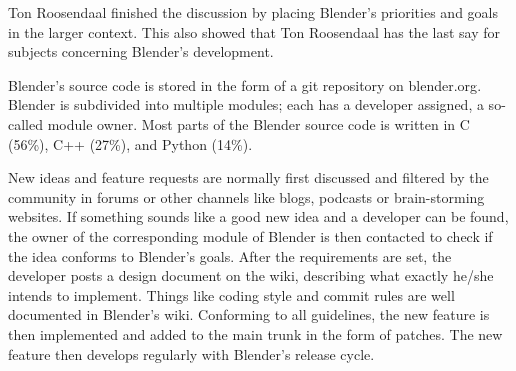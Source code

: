 Ton Roosendaal finished the discussion by placing Blender's priorities and goals in the larger context.\cite{blender-ton-ui}
This also showed that Ton Roosendaal has the last say for subjects concerning Blender's development.
\par
Blender's source code is stored in the form of a git repository on blender.org\cite{blender-repository}. Blender is subdivided into multiple modules; each has a developer assigned, a so-called module owner.\cite{blender-module-owners}
Most parts of the Blender source code is written in C (56\%), C++ (27\%), and Python (14\%).\cite{blender-code-stat}
\par
New ideas and feature requests are normally first discussed and filtered by the community in forums or other channels like blogs, podcasts or brain-storming websites.\cite{blender-community} 
If something sounds like a good new idea and a developer can be found, the owner of the corresponding module of Blender is then contacted to check if the idea conforms to Blender's goals. 
After the requirements are set, the developer posts a design document on the wiki, describing what exactly he/she intends to implement.\cite{blender-new-devs}
Things like coding style\cite{blender-style-rules} and commit rules\cite{blender-new-devs} are well documented in Blender's wiki. 
Conforming to all guidelines, the new feature is then implemented and added to the main trunk in the form of patches. 
The new feature then develops regularly with Blender's release cycle.

